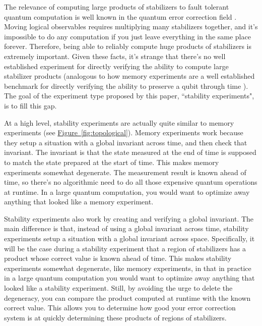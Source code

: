 \documentclass[onecolumn,unpublished,a4paper]{quantumarticle}
\theoremstyle{definition}
\theoremstyle{definition}
\theoremstyle{definition}
\newcommand{\fig}[1]{\hyperref[fig:#1]{Figure~\ref*{fig:#1}}}
\begin{document}
The relevance of computing large products of stabilizers to fault tolerant quantum computation is well known in the quantum error correction field \cite{Raus07d,horsman2012latticesurgery,chamberland2022building,chamberland2022universal,chamberland2022circuit}.
Moving logical observables requires multiplying many stabilizers together, and it's impossible to do any computation if you just leave everything in the same place forever.
Therefore, being able to reliably compute huge products of stabilizers is extremely important.
Given these facts, it's strange that there's no well established experiment for directly verifying the ability to compute large stabilizer products (analogous to how memory experiments are a well established benchmark for directly verifying the ability to preserve a qubit through time \cite{chen2021exponential,ryan2021realization,zhao2021realizing,krinner2021realizing,andersen2020repeated}).
The goal of the experiment type proposed by this paper, ``stability experiments", is to fill this gap.

At a high level, stability experiments are actually quite similar to memory experiments (see \fig{topological}).
Memory experiments work because they setup a situation with a global invariant across time, and then check that invariant.
The invariant is that the state measured at the end of time is supposed to match the state prepared at the start of time.
This makes memory experiments somewhat degenerate.
The measurement result is known ahead of time, so there's no algorithmic need to do all those expensive quantum operations at runtime.
In a large quantum computation, you would want to optimize away anything that looked like a memory experiment.

Stability experiments also work by creating and verifying a global invariant.
The main difference is that, instead of using a global invariant across time, stability experiments setup a situation with a global invariant across space.
Specifically, it will be the case during a stability experiment that a region of stabilizers has a product whose correct value is known ahead of time.
This makes stability experiments somewhat degenerate, like memory experiments, in that in practice in a large quantum computation you would want to optimize away anything that looked like a stability experiment.
Still, by avoiding the urge to delete the degeneracy, you can compare the product computed at runtime with the known correct value.
This allows you to determine how good your error correction system is at quickly determining these products of regions of stabilizers.
\end{document}
